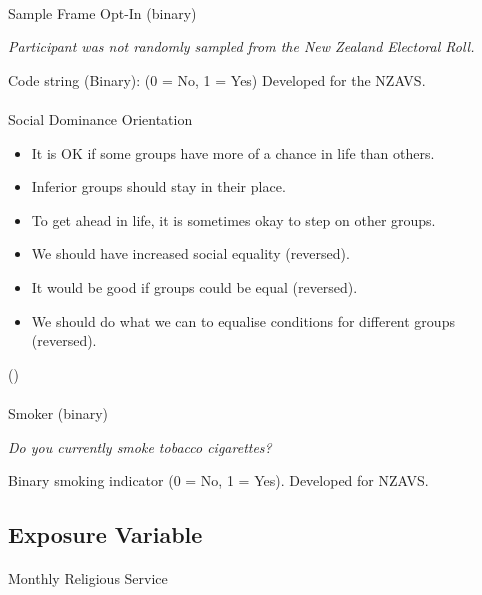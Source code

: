 \documentclass[
  single column]{article}
\makeatletter
\let\oldparagraph\paragraph
\renewcommand{\paragraph}{
    \@ifstar
      \xxxParagraphStar
      \xxxParagraphNoStar
  }
\newcommand{\xxxParagraphStar}[1]{\oldparagraph*{#1}\mbox{}}
\newcommand{\xxxParagraphNoStar}[1]{\oldparagraph{#1}\mbox{}}
\providecommand{\tightlist}{%
  \setlength{\itemsep}{0pt}\setlength{\parskip}{0pt}}\usepackage{longtable,booktabs,array}
\makeatother
\begin{document}
\paragraph{Sample Frame Opt-In
(binary)}\label{sample-frame-opt-in-binary}

\emph{Participant was not randomly sampled from the New Zealand
Electoral Roll.}

Code string (Binary): (0 = No, 1 = Yes) Developed for the NZAVS.

\paragraph{Social Dominance
Orientation}\label{social-dominance-orientation}

\begin{itemize}
\tightlist
\item
  It is OK if some groups have more of a chance in life than others.
\item
  Inferior groups should stay in their place.
\item
  To get ahead in life, it is sometimes okay to step on other groups.
\item
  We should have increased social equality (reversed).
\item
  It would be good if groups could be equal (reversed).
\item
  We should do what we can to equalise conditions for different groups
  (reversed).
\end{itemize}

()

\paragraph{Smoker (binary)}\label{smoker-binary}

\emph{Do you currently smoke tobacco cigarettes?}

Binary smoking indicator (0 = No, 1 = Yes). Developed for NZAVS.

\subsection{Exposure Variable}\label{exposure-variable}

\paragraph{Monthly Religious Service}\label{monthly-religious-service}
\end{document}
